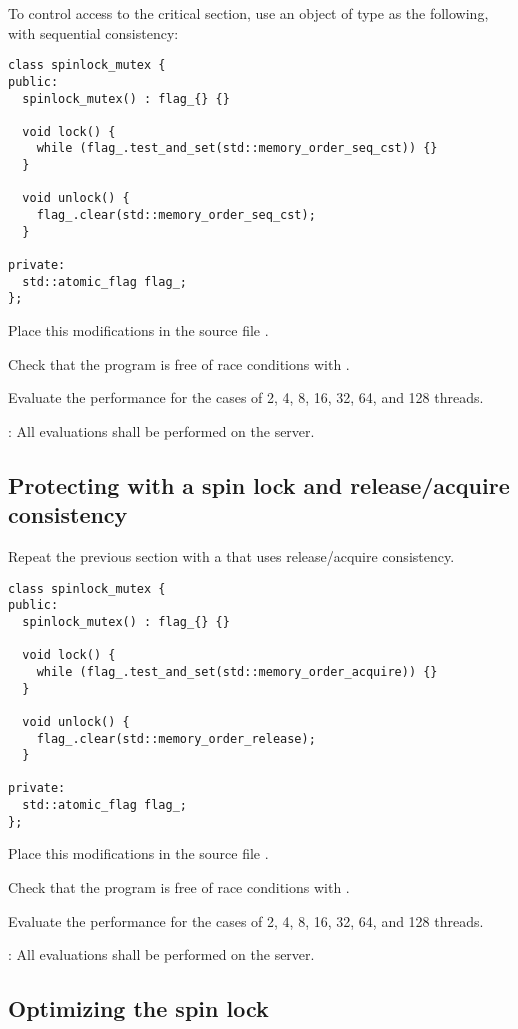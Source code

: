 To control access to the critical section, use an object of type  
as the following, with sequential consistency:
\begin{lstlisting}
class spinlock_mutex {
public:
  spinlock_mutex() : flag_{} {}

  void lock() {
    while (flag_.test_and_set(std::memory_order_seq_cst)) {}
  }

  void unlock() {
    flag_.clear(std::memory_order_seq_cst);
  }

private:
  std::atomic_flag flag_;
};
\end{lstlisting}

Place this modifications in the source file .

Check that the program is free of race conditions with .

Evaluate the performance for the cases of 2, 4, 8, 16, 32, 64, and 128 threads.

: All evaluations shall be performed on the  server.

\subsection{Protecting with a spin lock and release/acquire consistency}

Repeat the previous section with a  that uses
release/acquire consistency.

\begin{lstlisting}
class spinlock_mutex {
public:
  spinlock_mutex() : flag_{} {}

  void lock() {
    while (flag_.test_and_set(std::memory_order_acquire)) {}
  }

  void unlock() {
    flag_.clear(std::memory_order_release);
  }

private:
  std::atomic_flag flag_;
};
\end{lstlisting}

Place this modifications in the source file .

Check that the program is free of race conditions with .

Evaluate the performance for the cases of 2, 4, 8, 16, 32, 64, and 128 threads.

: All evaluations shall be performed on the  server.

\subsection{Optimizing the spin lock}

